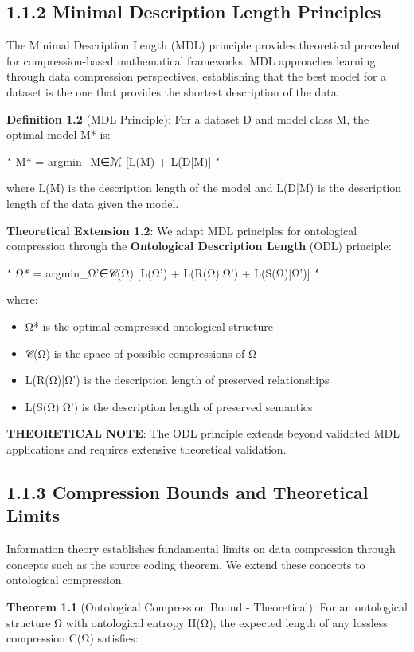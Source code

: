 \subsection{1.1.2 Minimal Description Length Principles}

The Minimal Description Length (MDL) principle provides theoretical precedent for compression-based mathematical frameworks. MDL approaches learning through data compression perspectives, establishing that the best model for a dataset is the one that provides the shortest description of the data.

\textbf{Definition 1.2} (MDL Principle): For a dataset D and model class M, the optimal model M* is:

\texttt{`}
M* = argmin_{M∈ℳ} [L(M) + L(D|M)]
\texttt{`}

where L(M) is the description length of the model and L(D|M) is the description length of the data given the model.

\textbf{Theoretical Extension 1.2}: We adapt MDL principles for ontological compression through the \textbf{Ontological Description Length} (ODL) principle:

\texttt{`}
Ω* = argmin_{Ω'∈𝒞(Ω)} [L(Ω') + L(R(Ω)|Ω') + L(S(Ω)|Ω')]
\texttt{`}

where:
\begin{itemize}
\item Ω* is the optimal compressed ontological structure
\item 𝒞(Ω) is the space of possible compressions of Ω
\item L(R(Ω)|Ω') is the description length of preserved relationships
\item L(S(Ω)|Ω') is the description length of preserved semantics
\end{itemize}

\textbf{THEORETICAL NOTE}: The ODL principle extends beyond validated MDL applications and requires extensive theoretical validation.

\subsection{1.1.3 Compression Bounds and Theoretical Limits}

Information theory establishes fundamental limits on data compression through concepts such as the source coding theorem. We extend these concepts to ontological compression.

\textbf{Theorem 1.1} (Ontological Compression Bound - Theoretical): For an ontological structure Ω with ontological entropy H(Ω), the expected length of any lossless compression C(Ω) satisfies:

